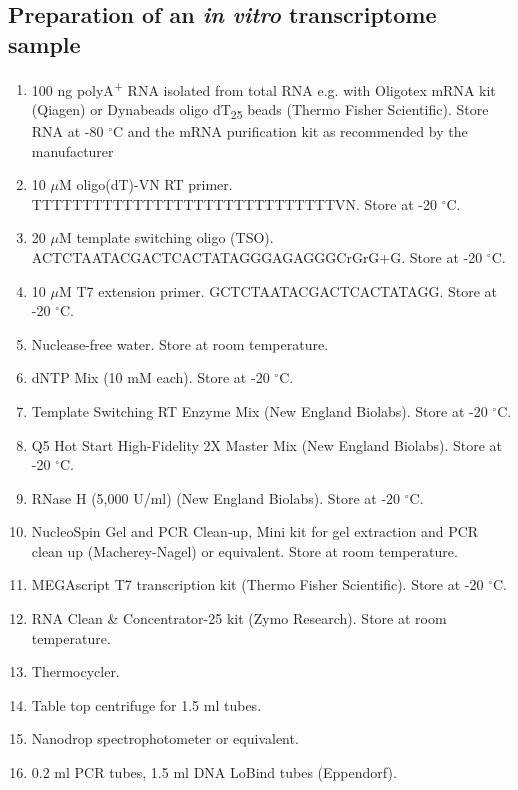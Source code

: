 \documentclass[times, 11pt, a4paper]{article}
\begin{document}
\subsection*{Preparation of an \emph{in vitro} transcriptome sample}
\begin{enumerate}
\item 100 ng polyA\textsuperscript{+} RNA isolated from total RNA e.g. with Oligotex mRNA kit (Qiagen) or Dynabeads oligo dT\textsubscript{25} beads (Thermo Fisher Scientific). Store RNA at -80 $^{\circ}$C and the mRNA purification kit as recommended by the manufacturer

\item 10 $\mu$M oligo(dT)-VN RT primer. TTTTTTTTTTTTTTTTTTTTTTTTTTTTTTVN. Store at -20 $^{\circ}$C.

\item 20 $\mu$M template switching oligo (TSO). ACTCTAATACGACTCACTATAGGGAGAGGGCrGrG+G. Store at -20 $^{\circ}$C.

\item 10 $\mu$M T7 extension primer. GCTCTAATACGACTCACTATAGG. Store at -20 $^{\circ}$C.

\item Nuclease-free water. Store at room temperature.

\item dNTP Mix (10 mM each). Store at -20 $^{\circ}$C.

\item Template Switching RT Enzyme Mix (New England Biolabs). Store at -20 $^{\circ}$C.

\item Q5 Hot Start High-Fidelity 2X Master Mix (New England Biolabs). Store at -20 $^{\circ}$C.

\item RNase H (5,000 U/ml) (New England Biolabs). Store at -20 $^{\circ}$C.

\item NucleoSpin Gel and PCR Clean‑up, Mini kit for gel extraction and PCR clean up (Macherey-Nagel) or equivalent. Store at room temperature.

\item MEGAscript T7 transcription kit (Thermo Fisher Scientific). Store at -20 $^{\circ}$C.

\item RNA Clean \& Concentrator-25 kit (Zymo Research). Store at room temperature.

\item Thermocycler.

\item Table top centrifuge for 1.5 ml tubes.

\item Nanodrop spectrophotometer or equivalent.

\item 0.2  ml PCR tubes, 1.5 ml DNA LoBind tubes (Eppendorf).

\end{enumerate}
\end{document}
